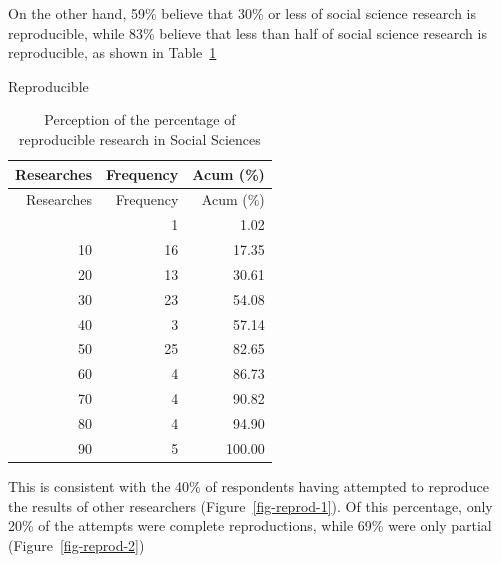 \documentclass[
  letterpaper,
  DIV=11,
  numbers=noendperiod]{scrartcl}
\begin{document}
On the other hand, 59\% believe that 30\% or less of social science
research is reproducible, while 83\% believe that less than half of
social science research is reproducible, as shown in
Table~\ref{tbl-tablaacum}

Reproducible

\hypertarget{tbl-tablaacum}{}
\begin{longtable}[]{@{}rrr@{}}
\caption{\label{tbl-tablaacum}Perception of the percentage of
reproducible research in Social Sciences}\tabularnewline
\toprule\noalign{}
Researches & Frequency & Acum (\%) \\
\midrule\noalign{}
\endfirsthead
\toprule\noalign{}
Researches & Frequency & Acum (\%) \\
\midrule\noalign{}
\endhead
\bottomrule\noalign{}
\endlastfoot
0 & 1 & 1.02 \\
10 & 16 & 17.35 \\
20 & 13 & 30.61 \\
30 & 23 & 54.08 \\
40 & 3 & 57.14 \\
50 & 25 & 82.65 \\
60 & 4 & 86.73 \\
70 & 4 & 90.82 \\
80 & 4 & 94.90 \\
90 & 5 & 100.00 \\
\end{longtable}

This is consistent with the 40\% of respondents having attempted to
reproduce the results of other researchers (Figure~\ref{fig-reprod-1}).
Of this percentage, only 20\% of the attempts were complete
reproductions, while 69\% were only partial (Figure~\ref{fig-reprod-2})
\end{document}

